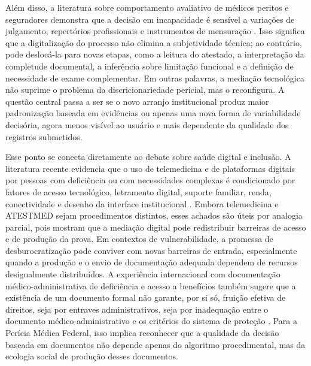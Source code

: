 \documentclass[12pt,a4paper]{article}
\begin{document}
Além disso, a literatura sobre comportamento avaliativo de médicos peritos e seguradores demonstra que a decisão em incapacidade é sensível a variações de julgamento, repertórios profissionais e instrumentos de mensuração \parencite{steenbeek2011thedevelopmentofinstrumentstomeasuretheworkdisa}. Isso significa que a digitalização do processo não elimina a subjetividade técnica; ao contrário, pode deslocá-la para novas etapas, como a leitura do atestado, a interpretação da completude documental, a inferência sobre limitação funcional e a definição de necessidade de exame complementar. Em outras palavras, a mediação tecnológica não suprime o problema da discricionariedade pericial, mas o reconfigura. A questão central passa a ser se o novo arranjo institucional produz maior padronização baseada em evidências ou apenas uma nova forma de variabilidade decisória, agora menos visível ao usuário e mais dependente da qualidade dos registros submetidos.

Esse ponto se conecta diretamente ao debate sobre saúde digital e inclusão. A literatura recente evidencia que o uso de telemedicina e de plataformas digitais por pessoas com deficiência ou com necessidades complexas é condicionado por fatores de acesso tecnológico, letramento digital, suporte familiar, renda, conectividade e desenho da interface institucional \parencite{albasheer2026telemedicineutilizationanddigitalinclusionamongpe, m2024astudyofdisabilityseveritybarriersandfacilitatingfactor}. Embora telemedicina e ATESTMED sejam procedimentos distintos, esses achados são úteis por analogia parcial, pois mostram que a mediação digital pode redistribuir barreiras de acesso e de produção da prova. Em contextos de vulnerabilidade, a promessa de desburocratização pode conviver com novas barreiras de entrada, especialmente quando a produção e o envio de documentação adequada dependem de recursos desigualmente distribuídos. A experiência internacional com documentação médico-administrativa de deficiência e acesso a benefícios também sugere que a existência de um documento formal não garante, por si só, fruição efetiva de direitos, seja por entraves administrativos, seja por inadequação entre o documento médico-administrativo e os critérios do sistema de proteção \parencite{rajasulochana2026doeshavingadisabilitycertificateensurebenefit}. Para a Perícia Médica Federal, isso implica reconhecer que a qualidade da decisão baseada em documentos não depende apenas do algoritmo procedimental, mas da ecologia social de produção desses documentos.
\end{document}
